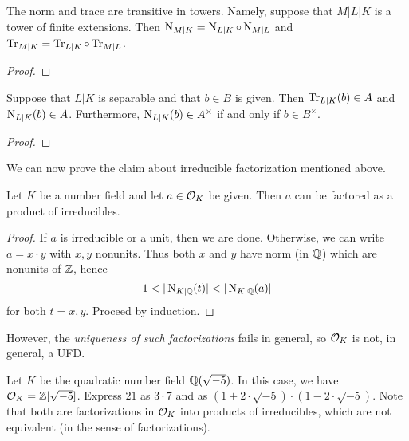 \begin{lemma}
  The norm and trace are transitive in towers.
  Namely, suppose that $M|L|K$ is a tower of finite extensions.
  Then $\operatorname{N}_{M|K} = \operatorname{N}_{L|K} \circ \operatorname{N}_{M|L}$ and $\operatorname{Tr}_{M|K} = \operatorname{Tr}_{L|K} \circ \operatorname{Tr}_{M|L}$.
\end{lemma}
\begin{proof}
\end{proof}

\begin{lemma}
  Suppose that $L|K$ is separable and that $b \in B$ is given.
  Then $\operatorname{Tr}_{L|K}(b) \in A$ and $\operatorname{N}_{L|K}(b) \in A$.
  Furthermore, $\operatorname{N}_{L|K}(b) \in A^{\times}$ if and only if $b \in B^{\times}$.
\end{lemma}
\begin{proof}
\end{proof}

We can now prove the claim about irreducible factorization mentioned above.
\begin{lemma}
  Let $K$ be a number field and let $a \in \mathcal{O}_{K}$ be given.
  Then $a$ can be factored as a product of irreducibles.
\end{lemma}
\begin{proof}
  If $a$ is irreducible or a unit, then we are done.
  Otherwise, we can write $a = x \cdot y$ with $x,y$ nonunits.
  Thus both $x$ and $y$ have norm (in $\mathbb{Q}$) which are nonunits of $\mathbb{Z}$, hence
  \[ 1 < |\operatorname{N}_{K|\mathbb{Q}}(t)| < |\operatorname{N}_{K|\mathbb{Q}}(a)| \]
  for both $t = x,y$.
  Proceed by induction.
\end{proof}

However, the \emph{uniqueness of such factorizations} fails in general, so $\mathcal{O}_{K}$ is not, in general, a UFD.
\begin{example}
  Let $K$ be the quadratic number field $\mathbb{Q}(\sqrt{-5})$.
  In this case, we have $\mathcal{O}_{K} = \mathbb{Z}[\sqrt{-5}]$.
  Express $21$ as $3 \cdot 7$ and as $(1 + 2 \cdot \sqrt{-5}) \cdot (1 - 2 \cdot \sqrt{-5})$.
  Note that both are factorizations in $\mathcal{O}_{K}$ into products of irreducibles, which are not equivalent (in the sense of factorizations).
\end{example}

